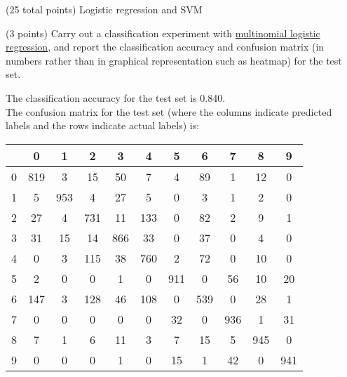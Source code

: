 \documentclass[12pt]{article}
\begin{document}
\begin{question}{(25 total points) Logistic regression and SVM}

  


  \medskip
   \begin{subquestion}{(3 points)
       Carry out a classification experiment with
       \href{https://scikit-learn.org/0.19/modules/generated/sklearn.linear\_model.LogisticRegression.html}{multinomial logistic regression},
       and report the classification accuracy and confusion matrix (in
       numbers rather than in graphical representation such as heatmap)
       for the test set.
     } \label{Q2.1}


   

      \begin{answerbox}{30em}
      The classification accuracy for the test set is 0.840. \\
      The confusion matrix for the test set (where the columns indicate predicted labels and the rows indicate actual labels) is:
	 \begin{center}
	\begin{tabular}{|c|c|c|c|c|c|c|c|c|c|c|}
		\hline
		& 0 & 1 & 2 & 3 & 4 & 5 & 6 & 7 & 8 & 9  \\  \hline
		0 & 819 & 3 & 15 & 50 & 7 & 4 & 89  & 1 & 12 & 0 \\
		1 & 5 & 953 &  4 & 27 &  5 &  0  & 3 &  1 &  2 &  0 \\
		2 & 27 &  4 & 731  &11 & 133  & 0 & 82  & 2  & 9 & 1 \\
		3 & 31 & 15 & 14 & 866 & 33 &  0 & 37  & 0  & 4 &  0 \\
		4 & 0  & 3 &115 & 38& 760  & 2 & 72 &  0  &10  & 0 \\
		5 & 2  & 0 &  0  & 1  & 0& 911 &  0 & 56 & 10 & 20 \\
		6 & 147 &  3 &128 & 46 &108  & 0& 539  & 0 & 28  & 1 \\
		7 & 0  & 0 &  0 &  0  & 0  &32  & 0&936  & 1 & 31 \\
		8 & 7  & 1  & 6 & 11  & 3  & 7 & 15  & 5 &945 &  0 \\
		9 & 0 &  0  & 0  &1  & 0 & 15   &1 & 42 &  0 &941 \\
		\hline
	\end{tabular}
	\end{center}
      \end{answerbox}
  



\end{subquestion}
\end{question}
\end{document}

